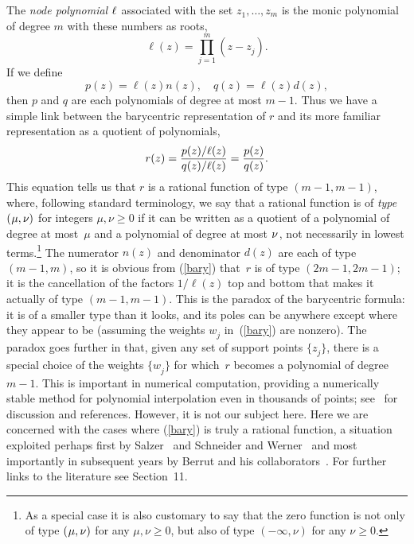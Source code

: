 \documentclass[final]{siamltex}
\begin{document}
The {\em node polynomial\/} $\ell\kern .5pt$ associated with the set
$z_1^{},\dots,z_m^{}$ is the monic polynomial of degree $m$ with
these numbers as roots,
\begin{equation}
\ell(z) = \prod_{j=1}^m (z-z_j^{}).
\label{node}
\end{equation}
If we define
\begin{equation}
p(z) = \ell(z) n(z), \quad q(z) = \ell(z) d(z),
\end{equation}
then $p$ and $q$ are each polynomials of degree at most $m-1$.
Thus we have a simple link between the barycentric
representation of $r$ and its more familiar representation as
a quotient of polynomials,
\begin{equation}
r(z) = {p(z)/\ell(z)\over q(z)/\ell(z)}
= {p(z)\over q(z)}.
\label{link}
\end{equation}
This equation tells us that $r$ is a rational function of type
$(m-1,m-1)$, where, following standard terminology, we say that
a rational function is of {\em type $(\kern .5pt\mu,\nu)$} for
integers $\mu,\nu \ge 0$ if it can be written as a quotient of a
polynomial of degree at most~$\mu$ and a polynomial of degree at
most $\nu\kern .7pt $, not necessarily in lowest terms.\footnote{As
a special case it is also customary to say that the zero function
is not only of type $(\kern .5pt \mu,\nu)$ for any $\mu,\nu\ge 0$,
but also of type $(-\infty,\nu)$ for any $\nu\ge 0$.} The numerator
$n(z)$ and denominator $d(z)$ are each of type $(m-1,m)$, so it
is obvious from (\ref{bary}) that~$r$ is of type $(2m-1,2m-1)$;
it is the cancellation of the factors $1/\ell(z)$ top and bottom
that makes it actually of type $(m-1,m-1)$.  This is the paradox
of the barycentric formula: it is of a smaller type than it looks,
and its poles can be anywhere except where they appear to be (assuming
the weights $w_j^{}$ in~(\ref{bary}) are nonzero).
The paradox goes further in that, given any set of support points
$\{z_j^{}\}$, there is a special choice of the weights $\{w_j^{}\}$
for which~$r$ becomes a polynomial of degree $m-1$.  This is
important in numerical computation, providing a numerically stable
method for polynomial interpolation even in thousands of points;
see~\cite{bt,chebfun,atap} for discussion and references.  However,
it is not our subject here.  Here we are concerned with the cases
where (\ref{bary}) is truly a rational function, a situation
exploited perhaps first by Salzer~\cite{salzer} and Schneider and
Werner~\cite{sw} and most importantly in subsequent years
by Berrut and his collaborators~\cite{berrut,berrut00,bbm,bt,fh,klein}.
For further links to the literature see Section~11.
\end{document}
